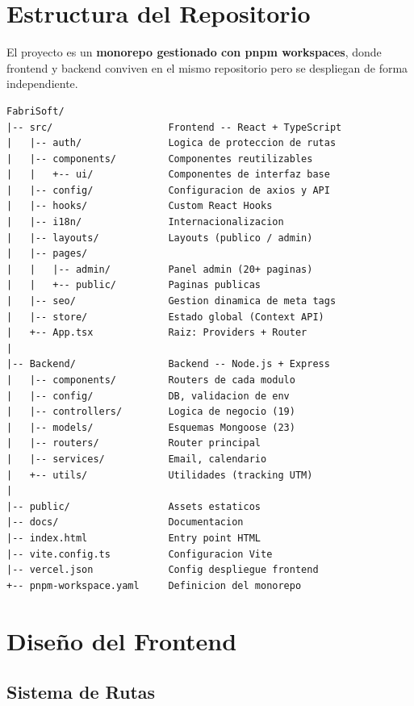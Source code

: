 \documentclass[12pt, a4paper, twoside]{report}
\begin{document}
\section{Estructura del Repositorio}

El proyecto es un \textbf{monorepo gestionado con pnpm workspaces}, donde frontend y backend
conviven en el mismo repositorio pero se despliegan de forma independiente.

\begin{tcolorbox}[codebox]
\begin{verbatim}
FabriSoft/
|-- src/                    Frontend -- React + TypeScript
|   |-- auth/               Logica de proteccion de rutas
|   |-- components/         Componentes reutilizables
|   |   +-- ui/             Componentes de interfaz base
|   |-- config/             Configuracion de axios y API
|   |-- hooks/              Custom React Hooks
|   |-- i18n/               Internacionalizacion
|   |-- layouts/            Layouts (publico / admin)
|   |-- pages/
|   |   |-- admin/          Panel admin (20+ paginas)
|   |   +-- public/         Paginas publicas
|   |-- seo/                Gestion dinamica de meta tags
|   |-- store/              Estado global (Context API)
|   +-- App.tsx             Raiz: Providers + Router
|
|-- Backend/                Backend -- Node.js + Express
|   |-- components/         Routers de cada modulo
|   |-- config/             DB, validacion de env
|   |-- controllers/        Logica de negocio (19)
|   |-- models/             Esquemas Mongoose (23)
|   |-- routers/            Router principal
|   |-- services/           Email, calendario
|   +-- utils/              Utilidades (tracking UTM)
|
|-- public/                 Assets estaticos
|-- docs/                   Documentacion
|-- index.html              Entry point HTML
|-- vite.config.ts          Configuracion Vite
|-- vercel.json             Config despliegue frontend
+-- pnpm-workspace.yaml     Definicion del monorepo
\end{verbatim}
\end{tcolorbox}

\section{Diseño del Frontend}

\subsection{Sistema de Rutas}
\end{document}
